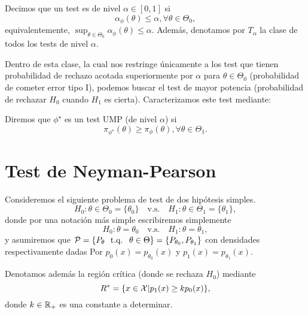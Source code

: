  \begin{definition}
 Decimos que un test es de nivel $\alpha\in[0,1]$ si 
\begin{equation}
 		\alpha_\phi(\theta)\leq\alpha, \forall \theta\in\Theta_0,
 	\end{equation}
 	equivalentemente, $\sup_{\theta\in\Theta_0}\alpha_\phi(\theta)\leq\alpha$. Además, denotamos por $T_\alpha$ la clase de todos los tests de nivel $\alpha$. 
 \end{definition}
 Dentro de esta clase, la cual nos restringe únicamente a los test que tienen probabilidad de rechazo acotada superiormente por $\alpha$  para $\theta\in\Theta_0$ (probabilidad de cometer error tipo I), podemos buscar el test de mayor potencia (probabilidad de rechazar $H_0$ cuando $H_1$ es cierta). Caracterizamos este test mediante: 

 \begin{definition}
 	Diremos que $\phi^\star$ es un test UMP (de nivel $\alpha$)  si 
 	\begin{equation}
 		\pi_{\phi^\star}(\theta)\geq \pi_{\phi}(\theta), \forall\theta\in\Theta_1.
 	\end{equation}
 	
 \end{definition}



\section{Test de Neyman-Pearson} 
\label{sub:test_de_neyman_pearson}
Consideremos el siguiente problema de test de dos hipótesis simples. 
\begin{equation}
	H_0:\theta\in\Theta_0=\{\theta_0\}\quad \text{v.s.}\quad H_1:\theta\in\Theta_1=\{\theta_1\},
\end{equation}
donde por una notación más simple escribiremos simplemente 
\begin{equation}
	H_0:\theta =\theta_0\quad \text{v.s.}\quad H_1:\theta = \theta_1,		
\end{equation}
y asumiremos que $\mathcal{P} = \{P_\theta\ {\text{ t.q. }}\ \theta\in\Theta\}=\{P_{\theta_0},P_{\theta_1}\}$ con densidades respectivamente dadas Por $p_0(x) = p_{\theta_0}(x)$ y $p_1(x) = p_{\theta_1}(x)$.

Denotamos además la región crítica (donde se rechaza $H_0$) mediante
\begin{equation}
	\label{eq:R_NR}
	R^* = \{x\in{\mathcal X} | p_1(x) \geq k p_0(x)\},
\end{equation}
donde $k\in{\mathbb R}_+$ es una constante a determinar. 

